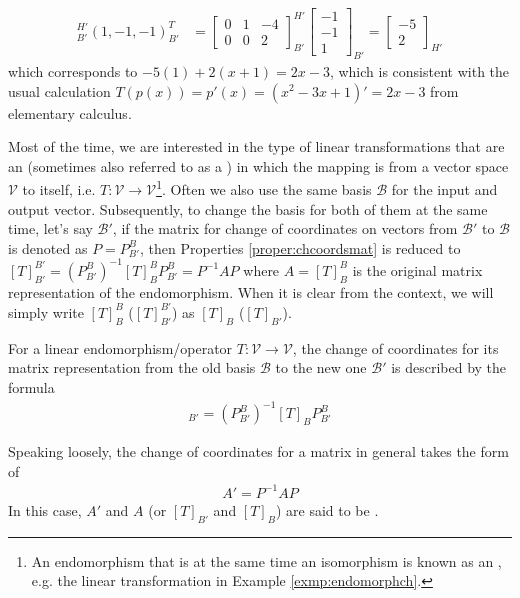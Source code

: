 \begin{solution}
\begin{align*}
[T]_{B'}^{H'} (1,-1,-1)^T_{B'} &= 
\begin{bmatrix}
0 & 1 & -4 \\
0 & 0 & 2
\end{bmatrix}_{B'}^{H'}
\begin{bmatrix}
-1 \\
-1 \\
1
\end{bmatrix}_{B'}
=
\begin{bmatrix}
-5 \\
2
\end{bmatrix}_{H'}
\end{align*}
which corresponds to $-5(1) + 2(x+1) = 2x-3$, which is consistent with the usual calculation $T(p(x)) = p'(x) = (x^2-3x+1)' = 2x-3$ from elementary calculus.
\end{solution}

Most of the time, we are interested in the type of linear transformations that are an  (sometimes also referred to as a ) in which the mapping is from a vector space $\mathcal{V}$ to itself, i.e. $T: \mathcal{V} \to \mathcal{V}$\footnote{An endomorphism that is at the same time an isomorphism is known as an , e.g. the linear transformation in Example \ref{exmp:endomorphch}.}. Often we also use the same basis $\mathcal{B}$ for the input and output vector. Subsequently, to change the basis for both of them at the same time, let's say $\mathcal{B}'$, if the matrix for change of coordinates on vectors from $\mathcal{B}'$ to $\mathcal{B}$ is denoted as $P = P_{B'}^B$, then Properties \ref{proper:chcoordsmat} is reduced to $[T]_{B'}^{B'} = (P_{B'}^B)^{-1} [T]_B^B P_{B'}^B = P^{-1}AP$ where $A = [T]_B^B$ is the original matrix representation of the endomorphism. When it is clear from the context, we will simply write $[T]_B^B$ ($[T]_{B'}^{B'}$) as $[T]_B$ ($[T]_{B'}$).
\begin{proper}
\label{proper:endomorph}
For a linear endomorphism/operator $T: \mathcal{V} \to \mathcal{V}$, the change of coordinates for its matrix representation from the old basis $\mathcal{B}$ to the new one $\mathcal{B}'$ is described by the formula
\begin{align*}
[T]_{B'} = (P_{B'}^B)^{-1} [T]_B P_{B'}^B    
\end{align*}
\end{proper}
Speaking loosely, the change of coordinates for a matrix in general takes the form of
\begin{align*}
A' = P^{-1}AP
\end{align*}
In this case, $A'$ and $A$ (or $[T]_{B'}$ and $[T]_B$) are said to be .

